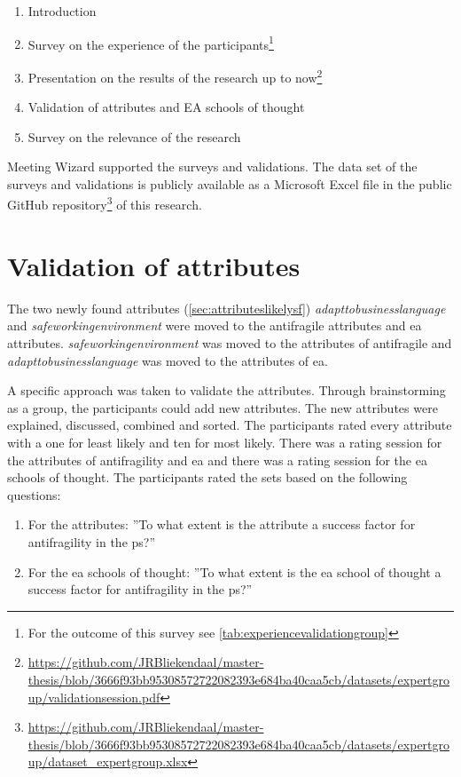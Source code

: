 \begin{enumerate}
	\item{Introduction}
	\item{Survey on the experience of the participants\footnote{For the outcome of this survey see \cref{tab:experiencevalidationgroup}}}
	\item{Presentation on the results of the research up to now\footnote{\url{https://github.com/JRBliekendaal/master-thesis/blob/3666f93bb95308572722082393e684ba40caa5cb/datasets/expertgroup/validationsession.pdf}}}
	\item{Validation of attributes and EA schools of thought}
	\item{Survey on the relevance of the research}
\end{enumerate}
Meeting Wizard supported the surveys and validations. The data set of the surveys and validations is publicly available as a Microsoft Excel file in the public GitHub repository\footnote{\url{https://github.com/JRBliekendaal/master-thesis/blob/3666f93bb95308572722082393e684ba40caa5cb/datasets/expertgroup/dataset_expertgroup.xlsx}} of this research.
\section{Validation of attributes}
\label{sec:validationofattributes}
The two newly found attributes (\cref{sec:attributeslikelysf}) \textit{\gls{adapttobusinesslanguage}} and \textit{\gls{safeworkingenvironment}} were moved to the \gls{antifragile} \glspl{attribute} and \acrshort{ea} \glspl{attribute}. \textit{\Gls{safeworkingenvironment}} was moved to the \glspl{attribute} of \gls{antifragile} and \textit{\gls{adapttobusinesslanguage}} was moved to the \glspl{attribute} of \acrshort{ea}. 

A specific approach was taken to validate the \glspl{attribute}. Through brainstorming as a group, the participants could add new \glspl{attribute}. The new \glspl{attribute} were explained, discussed, combined and sorted. The participants rated every \gls{attribute} with a one for least likely and ten for most likely. There was a rating session for the \glspl{attribute} of \gls{antifragility} and \acrshort{ea} and there was a rating session for the \acrshort{ea} schools of thought. The participants rated the sets based on the following questions:
\begin{enumerate}
	\item{For the \glspl{attribute}: ''To what extent is the \gls{attribute} a success factor for \gls{antifragility} in the \gls{ps}?''}
	\item{For the \acrlong{ea} schools of thought: ''To what extent is the \acrlong{ea} school of thought a success factor for \gls{antifragility} in the \gls{ps}?''}
\end{enumerate}
